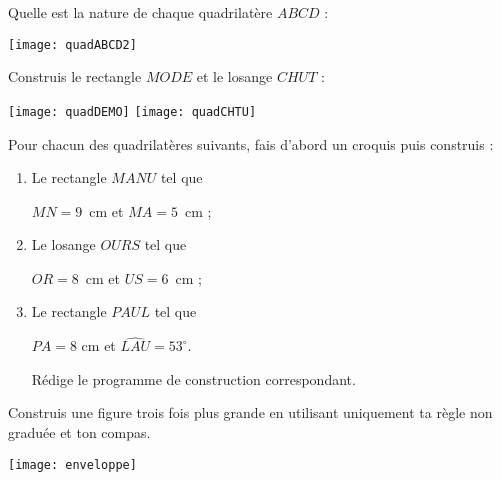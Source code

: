 \newpage




\begin{exercice}[Reconnaître]
Quelle est la nature de chaque quadrilatère $ABCD$ :
\begin{center} \texttt{[image: quadABCD2]} \end{center}
\end{exercice}


\begin{exercice}[Constructions]
Construis le rectangle $MODE$ et le losange $CHUT$ :

\qquad \texttt{[image: quadDEMO]} \qquad \texttt{[image: quadCHTU]}
\end{exercice}



\begin{exercice}
Pour chacun des quadrilatères suivants, fais d’abord un croquis puis construis :
\begin{enumerate}
 \item Le rectangle $MANU$ tel que 
 
 $MN = 9$ cm et $MA = 5$ cm ;
 \item Le losange $OURS$ tel que 
 
 $OR = 8$ cm et $US = 6$ cm ;
 \item Le rectangle $PAUL$ tel que 
 
 $PA = 8$ cm et $\widehat{LAU} = 53^\circ$. 
 
 Rédige le programme de construction correspondant.
 \end{enumerate}
\end{exercice}


\begin{exercice}
\vspace{1em}
\begin{minipage}[c]{0.50\linewidth}
Construis une figure trois fois plus grande en utilisant uniquement ta règle non graduée et ton compas.
 \end{minipage} \hfill%
 \begin{minipage}[c]{0.42\linewidth}
  \texttt{[image: enveloppe]}
  \end{minipage} \\
\end{exercice}


